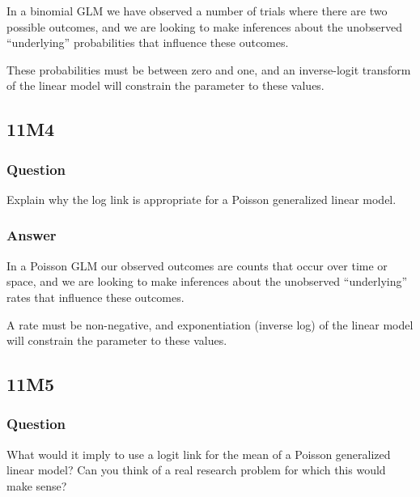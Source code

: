 \documentclass[
]{book}
\begin{document}
In a binomial GLM we have observed a number of trials where there are two possible outcomes, and we are looking to make inferences about the unobserved ``underlying'' probabilities that influence these outcomes.

These probabilities must be between zero and one, and an inverse-logit transform of the linear model will constrain the parameter to these values.

\hypertarget{m4-4}{%
\subsection*{11M4}\label{m4-4}}

\hypertarget{question-88}{%
\subsubsection*{Question}\label{question-88}}

Explain why the log link is appropriate for a Poisson generalized linear model.

\hypertarget{answer-88}{%
\subsubsection*{Answer}\label{answer-88}}

In a Poisson GLM our observed outcomes are counts that occur over time or space, and we are looking to make inferences about the unobserved ``underlying'' rates that influence these outcomes.

A rate must be non-negative, and exponentiation (inverse log) of the linear model will constrain the parameter to these values.

\hypertarget{m5-4}{%
\subsection*{11M5}\label{m5-4}}

\hypertarget{question-89}{%
\subsubsection*{Question}\label{question-89}}

What would it imply to use a logit link for the mean of a Poisson generalized linear model? Can you think of a real research problem for which this would make sense?
\end{document}
